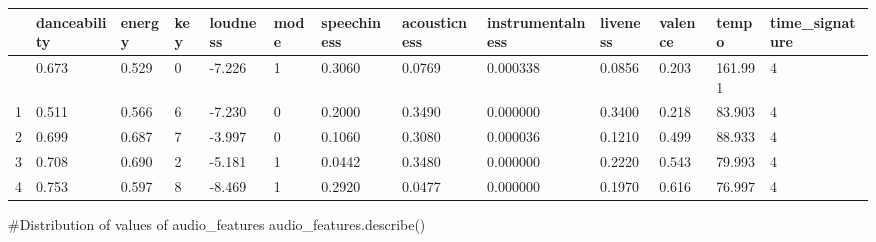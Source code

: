 \documentclass[
  letterpaper,
  DIV=11,
  numbers=noendperiod]{scrreprt}
\newenvironment{Shaded}{\begin{snugshade}}{\end{snugshade}}
\newcommand{\CommentTok}[1]{\textcolor[rgb]{0.37,0.37,0.37}{#1}}
\newcommand{\NormalTok}[1]{\textcolor[rgb]{0.00,0.23,0.31}{#1}}
\begin{document}
\begin{longtable}[]{@{}lllllllllllll@{}}
\toprule\noalign{}
& danceability & energy & key & loudness & mode & speechiness &
acousticness & instrumentalness & liveness & valence & tempo &
time\_signature \\
\midrule\noalign{}
\endhead
\bottomrule\noalign{}
\endlastfoot
0 & 0.673 & 0.529 & 0 & -7.226 & 1 & 0.3060 & 0.0769 & 0.000338 & 0.0856
& 0.203 & 161.991 & 4 \\
1 & 0.511 & 0.566 & 6 & -7.230 & 0 & 0.2000 & 0.3490 & 0.000000 & 0.3400
& 0.218 & 83.903 & 4 \\
2 & 0.699 & 0.687 & 7 & -3.997 & 0 & 0.1060 & 0.3080 & 0.000036 & 0.1210
& 0.499 & 88.933 & 4 \\
3 & 0.708 & 0.690 & 2 & -5.181 & 1 & 0.0442 & 0.3480 & 0.000000 & 0.2220
& 0.543 & 79.993 & 4 \\
4 & 0.753 & 0.597 & 8 & -8.469 & 1 & 0.2920 & 0.0477 & 0.000000 & 0.1970
& 0.616 & 76.997 & 4 \\
\end{longtable}

\begin{Shaded}
\begin{Highlighting}[]
\CommentTok{\#Distribution of values of audio\_features}
\NormalTok{audio\_features.describe()}
\end{Highlighting}
\end{Shaded}
\end{document}

